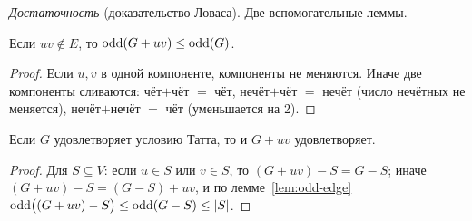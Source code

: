 \textit{Достаточность} (доказательство Ловаса). Две вспомогательные леммы.
\begin{lemma}\label{lem:odd-edge}
Если \(uv\notin E\), то \(\operatorname{odd}(G+uv)\le\operatorname{odd}(G)\).
\end{lemma}
\begin{proof}
Если \(u,v\) в одной компоненте, компоненты не меняются. Иначе две компоненты
сливаются: чёт\(+\)чёт \(=\) чёт, нечёт\(+\)чёт \(=\) нечёт (число нечётных
не меняется), нечёт\(+\)нечёт \(=\) чёт (уменьшается на 2).
\end{proof}
\begin{lemma}
Если \(G\) удовлетворяет условию Татта, то и \(G+uv\) удовлетворяет.
\end{lemma}
\begin{proof}
Для \(S\subseteq V\): если \(u\in S\) или \(v\in S\), то \((G+uv)-S=G-S\);
иначе \((G+uv)-S=(G-S)+uv\), и по лемме~\ref{lem:odd-edge}
\(\operatorname{odd}\bigl((G+uv)-S\bigr)\le\operatorname{odd}(G-S)\le|S|\).
\end{proof}
